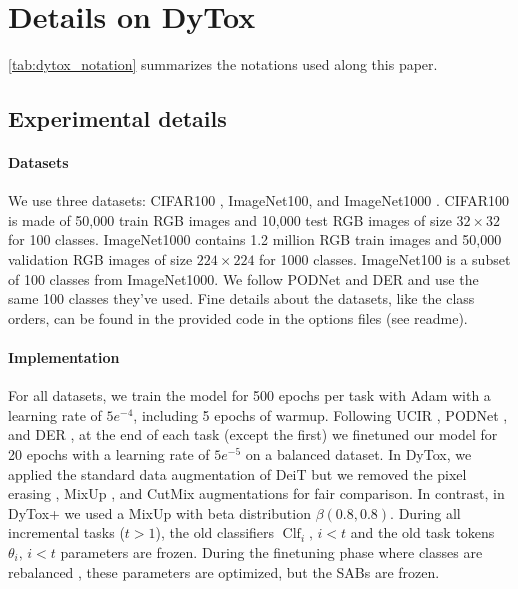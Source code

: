 \section{Details on DyTox}
\label{sec:appendix_dytox}


\noindent\autoref{tab:dytox_notation} summarizes the notations used along this paper.




\subsection{Experimental details}

\paragraph{Datasets} We use three datasets: CIFAR100 \cite{krizhevskycifar100}, ImageNet100, and
ImageNet1000 \cite{deng2009imagenet}. CIFAR100 is made of 50,000 train RGB images and 10,000 test
RGB images of size $32\times32$ for 100 classes. ImageNet1000 contains 1.2 million RGB train images
and 50,000 validation RGB images of size $224\times224$ for 1000 classes. ImageNet100 is a subset of
100 classes from ImageNet1000. We follow PODNet \cite{douillard2020podnet} and DER \cite{yan2021der}
and use the same 100 classes they've used. Fine details about the datasets, like the class orders,
can be found in the provided code in the options files (see readme).

\paragraph{Implementation} For all datasets, we train the model for 500 epochs per task with Adam
\cite{kingma2014adam} with a learning rate of $5e^{-4}$, including 5 epochs of warmup.
Following UCIR \cite{hou2019ucir}, PODNet \cite{douillard2020podnet}, and DER \cite{yan2021der}, at
the end of each task (except the first) we finetuned our model for 20 epochs with a learning rate of
$5e^{-5}$ on a balanced dataset. In DyTox, we applied the standard data augmentation of DeiT
\cite{touvron2021deit} but we removed the pixel erasing \cite{zhong2017erasing}, MixUp
\cite{hingyi2018mixup}, and CutMix \cite{yun2019cutmix} augmentations for fair comparison. In
contrast, in DyTox+ we used a MixUp \cite{hingyi2018mixup} with beta distribution $\beta(0.8, 0.8)$.
During all incremental tasks ($t>1$), the old classifiers $\operatorname{Clf}_i,\, i < t$ and the
old task tokens $\theta_i,\, i < t$ parameters are frozen. During the finetuning phase where classes
are rebalanced \cite{castro2018end_to_end_inc_learn,hou2019ucir,douillard2020podnet,yan2021der},
these parameters are optimized, but the SABs are frozen.

